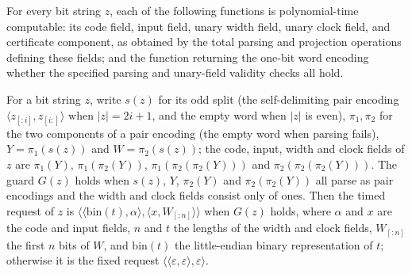 \begin{lemma}
\label{Complexity.tmsat_fields_poly}
\leanok
{}
For every bit string $z$, each of the following functions is polynomial-time computable:
its code field, input field, unary width field, unary clock field, and certificate
component, as obtained by the total parsing and projection operations defining these
fields; and the function returning the one-bit word encoding whether the specified
parsing and unary-field validity checks all hold.
\end{lemma}

\begin{definition}
\label{Complexity.tmsatRequest}
\leanok
{}
For a bit string $z$, write $s(z)$ for its odd split (the self-delimiting pair encoding $\langle z_{[:i]}, z_{[i:]}\rangle$ when $|z| = 2i+1$, and the empty word when $|z|$ is even), $\pi_1, \pi_2$ for the two components of a pair encoding (the empty word when parsing fails), $Y = \pi_1(s(z))$ and $W = \pi_2(s(z))$; the code, input, width and clock fields of $z$ are $\pi_1(Y)$, $\pi_1(\pi_2(Y))$, $\pi_1(\pi_2(\pi_2(Y)))$ and $\pi_2(\pi_2(\pi_2(Y)))$. The guard $G(z)$ holds when $s(z)$, $Y$, $\pi_2(Y)$ and $\pi_2(\pi_2(Y))$ all parse as pair encodings and the width and clock fields consist only of ones. Then the timed request of $z$ is $\langle\langle \mathrm{bin}(t), \alpha\rangle, \langle x, W_{[:n]}\rangle\rangle$ when $G(z)$ holds, where $\alpha$ and $x$ are the code and input fields, $n$ and $t$ the lengths of the width and clock fields, $W_{[:n]}$ the first $n$ bits of $W$, and $\mathrm{bin}(t)$ the little-endian binary representation of $t$; otherwise it is the fixed request $\langle\langle\varepsilon,\varepsilon\rangle,\varepsilon\rangle$.
\end{definition}

